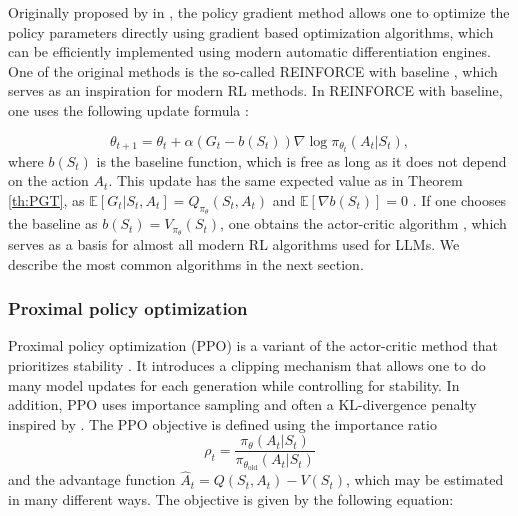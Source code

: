 Originally proposed by \citeauthor{Williams1992} in \cite{Williams1992}, the policy gradient method allows one to optimize the policy parameters directly using gradient based optimization algorithms, which can be efficiently implemented using modern automatic differentiation engines. One of the original methods is the so-called REINFORCE with baseline \cite{Williams1992}, which serves as an inspiration for modern RL methods. In REINFORCE with baseline, one uses the following update formula \cite{SuttonAndBarto2018}:

\begin{equation*}
    \theta_{t+1} = \theta_t + \alpha(G_t - b(S_t))\nabla\log\pi_{\theta_t}(A_t | S_t),
\end{equation*}
where $b(S_t)$ is the baseline function, which is free as long as it does not depend on the action $A_t$. This update has the same expected value as in Theorem \ref{th:PGT}, as $\mathbb{E}[G_t | S_t, A_t] = Q_{\pi_\theta}(S_t, A_t)$ and $\mathbb{E}[\nabla b(S_t)] = 0$ \cite{SuttonAndBarto2018}. If one chooses the baseline as $b(S_t) = V_{\pi_\theta}(S_t)$, one obtains the actor-critic algorithm \cite{Actor-criticAlgorithms}, which serves as a basis for almost all modern RL algorithms used for LLMs. We describe the most common algorithms in the next section.



\subsubsection{Proximal policy optimization}
\label{sec:PPO}


Proximal policy optimization (PPO) is a variant of the actor-critic method that prioritizes stability \cite{schulman2017proximalpolicyoptimizationalgorithms}. It introduces a clipping mechanism that allows one to do many model updates for each generation while controlling for stability. In addition, PPO uses importance sampling and often a KL-divergence penalty inspired by \cite{schulman2017trustregionpolicyoptimization}. The PPO objective is defined using the importance ratio
\begin{equation*}
    \rho_t = \frac{\pi_\theta(A_t | S_t)}{\pi_{\theta_\text{old}}(A_t | S_t)}
\end{equation*}
and the advantage function $\hat{A}_t = Q(S_t, A_t) - V(S_t)$, which may be estimated in many different ways. The objective is given by the following equation:

